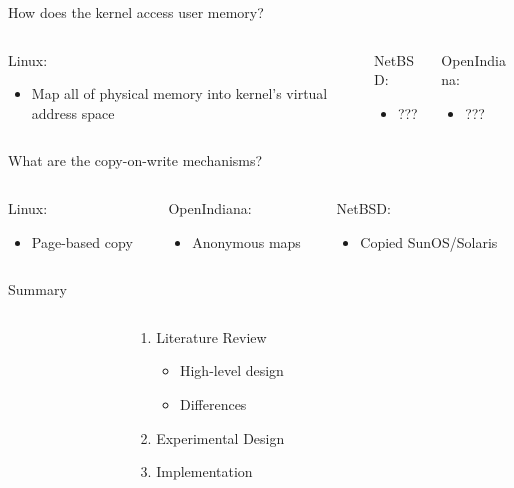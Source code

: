 \documentclass[aspectratio=169]{beamer}
\newcommand{\bi}{\begin{itemize}}
\newcommand{\ei}{\end{itemize}}
\newcommand{\bn}{\begin{enumerate}}
\newcommand{\en}{\end{enumerate}}
\begin{document}
\begin{frame}{How does the kernel access user memory?}
  \begin{columns}[T]
    \begin{column}{0.3\textwidth}
      Linux:
      \bi
    \item Map all of physical memory into kernel's virtual address space
      \ei
    \end{column}
    \pause
    \begin{column}{0.4\textwidth}
      NetBSD:
      \bi
    \item ???
      \ei
    \end{column}
    \pause
    \begin{column}{0.3\textwidth}
      OpenIndiana:
      \bi
    \item ???
      \ei
    \end{column}
  \end{columns}
\end{frame}

\begin{frame}{What are the copy-on-write mechanisms?}
  \begin{columns}[T]
    \begin{column}{0.3\textwidth}
      Linux:
      \bi
    \item Page-based copy
      \ei
    \end{column}
    \pause
    \begin{column}{0.3\textwidth}
      OpenIndiana:
      \bi
    \item Anonymous maps
      \ei
    \end{column}
    \pause
    \begin{column}{0.4\textwidth}
      NetBSD:
      \bi
    \item Copied SunOS/Solaris
      \ei
    \end{column}
  \end{columns}
\end{frame}

\begin{frame}{Summary}
  \begin{columns}[T]
    \begin{column}{0.2\textwidth}
    \end{column}
    \begin{column}{0.6\textwidth}
      \bn
    \item Literature Review
      \bi
    \item High-level design
    \item Differences
      \ei
    \item Experimental Design
    \item Implementation
      \en
    \end{column}
    \begin{column}{0.2\textwidth}
    \end{column}
  \end{columns}
\end{frame}
\end{document}
